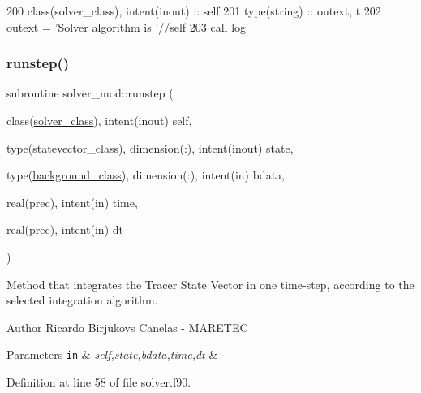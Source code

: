 \begin{DoxyCode}
200     \textcolor{keywordtype}{class}(solver\_class), \textcolor{keywordtype}{intent(inout)} :: self
201     \textcolor{keywordtype}{type}(string) :: outext, t
202     outext = \textcolor{stringliteral}{'Solver algorithm is '}//self%
203     \textcolor{keyword}{call }log%
\end{DoxyCode}
\mbox{\label{namespacesolver__mod_a75c5c8b01ae4ae193ff03dbe7e5fc6af}} 
\subsubsection{\texorpdfstring{runstep()}{runstep()}}
{\footnotesize\ttfamily subroutine solver\+\_\+mod\+::runstep (\begin{DoxyParamCaption}\item[{class(\mbox{\hyperlink{structsolver__mod_1_1solver__class}{solver\+\_\+class}}), intent(inout)}]{self,  }\item[{type(statevector\+\_\+class), dimension(\+:), intent(inout)}]{state,  }\item[{type(\mbox{\hyperlink{structbackground__mod_1_1background__class}{background\+\_\+class}}), dimension(\+:), intent(in)}]{bdata,  }\item[{real(prec), intent(in)}]{time,  }\item[{real(prec), intent(in)}]{dt }\end{DoxyParamCaption})\hspace{0.3cm}{\ttfamily [private]}}



Method that integrates the Tracer State Vector in one time-\/step, according to the selected integration algorithm. 

\begin{DoxyAuthor}{Author}
Ricardo Birjukovs Canelas -\/ M\+A\+R\+E\+T\+EC 
\end{DoxyAuthor}

\begin{DoxyParams}[1]{Parameters}
\mbox{\tt in}  & {\em self,state,bdata,time,dt} & \\
\hline
\end{DoxyParams}


Definition at line 58 of file solver.\+f90.


